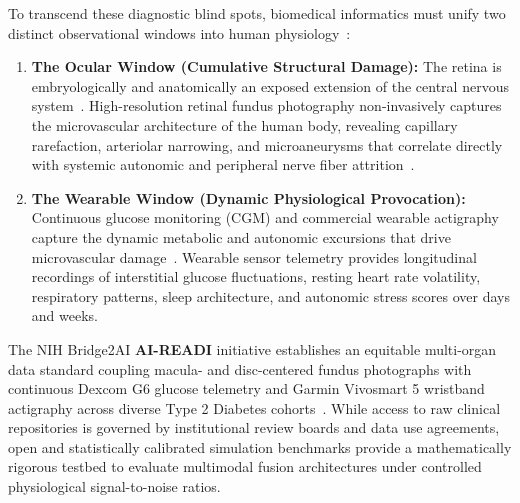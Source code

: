 \documentclass[journal,10pt,twocolumn]{IEEEtran}
\begin{document}
To transcend these diagnostic blind spots, biomedical informatics must unify two distinct observational windows into human physiology~\cite{baltrusaitis2018multimodal,dunn2021wearable}:
\begin{enumerate}
    \item \textbf{The Ocular Window (Cumulative Structural Damage):} The retina is embryologically and anatomically an exposed extension of the central nervous system~\cite{wagner2020insights}. High-resolution retinal fundus photography non-invasively captures the microvascular architecture of the human body, revealing capillary rarefaction, arteriolar narrowing, and microaneurysms that correlate directly with systemic autonomic and peripheral nerve fiber attrition~\cite{poplin2018prediction,ting2017development,gulshan2016development,zhou2023retfound,cheung2008retinal}.
    \item \textbf{The Wearable Window (Dynamic Physiological Provocation):} Continuous glucose monitoring (CGM) and commercial wearable actigraphy capture the dynamic metabolic and autonomic excursions that drive microvascular damage~\cite{danne2017international,dunn2021wearable}. Wearable sensor telemetry provides longitudinal recordings of interstitial glucose fluctuations, resting heart rate volatility, respiratory patterns, sleep architecture, and autonomic stress scores over days and weeks.
\end{enumerate}

The NIH Bridge2AI \textbf{AI-READI} initiative establishes an equitable multi-organ data standard coupling macula- and disc-centered fundus photographs with continuous Dexcom G6 glucose telemetry and Garmin Vivosmart 5 wristband actigraphy across diverse Type 2 Diabetes cohorts~\cite{aireadi2024}. While access to raw clinical repositories is governed by institutional review boards and data use agreements, open and statistically calibrated simulation benchmarks provide a mathematically rigorous testbed to evaluate multimodal fusion architectures under controlled physiological signal-to-noise ratios.
\end{document}
